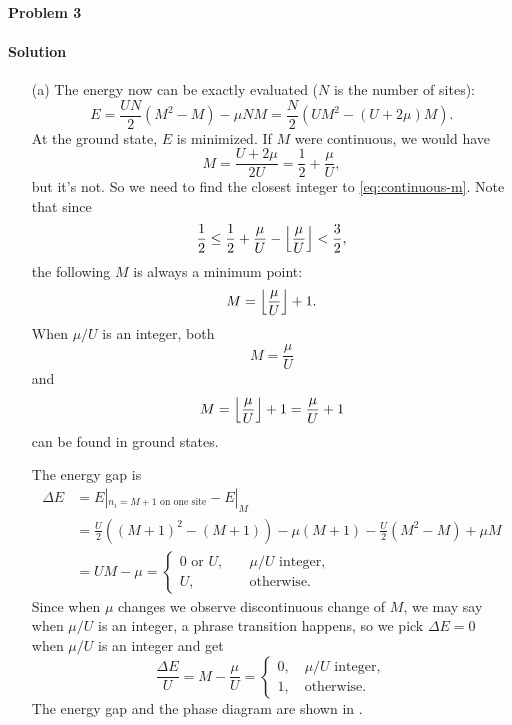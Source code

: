 \documentclass[hyperref, a4paper]{article}
\DeclarePairedDelimiter\floor{\lfloor}{\rfloor}
\begin{document}
\paragraph{Problem 3}

\paragraph{Solution} \begin{itemize}
\item[(a)] The energy now can be exactly evaluated ($N$ is the number of sites):
\begin{equation}
    E = \frac{U N}{2} (M^2 - M) - \mu NM
    = \frac{N}{2} (U M^2 - (U + 2\mu) M).
\end{equation}
At the ground state, $E$ is minimized.
If $M$ were continuous, we would have
\begin{equation}
    M = \frac{U + 2\mu}{2 U} = \frac{1}{2} + \frac{\mu}{U}, 
    \label{eq:continuous-m}
\end{equation}
but it's not. So we need to find the closest integer to \eqref{eq:continuous-m}.
Note that since
\[
    \frac{1}{2} \leq \frac{1}{2} + \frac{\mu}{U} - \floor*{\frac{\mu}{U}} < \frac{3}{2},
\]
the following $M$ is always a minimum point:
\begin{equation}
    M = \floor*{\frac{\mu}{U}} + 1.
\end{equation}
When $\mu / U$ is an integer, both 
\begin{equation}
    M = \frac{\mu}{U} 
\end{equation}
and 
\begin{equation}
    M = \floor*{\frac{\mu}{U}} + 1 = \frac{\mu}{U} + 1
\end{equation}
can be found in ground states.

The energy gap is 
\begin{equation}
    \begin{aligned}
        \Delta E &= E|_{n_i = M+1 \text{ on one site}} - E|_M  \\
        &= \frac{U}{2} ((M+1)^2 - (M+1)) - \mu (M+1)
        - \frac{U}{2} (M^2 - M) + \mu M \\
        &= UM - \mu
        = \begin{cases}
            0 \text{ or } U, \quad &\text{$\mu / U$ integer}, \\
            U,\quad &\text{otherwise}.
        \end{cases}
    \end{aligned}
\end{equation}
Since when $\mu$ changes we observe discontinuous change of $M$,
we may say when $\mu / U$ is an integer,
a phrase transition happens,
so we pick $\Delta E = 0$ when $\mu / U$ is an integer and get 
\begin{equation}
    \frac{\Delta E}{U} = M - \frac{\mu}{U}
    = \begin{cases}
        0, \quad \text{$\mu / U$ integer}, \\
        1, \quad \text{otherwise}. 
    \end{cases}
\end{equation}
The energy gap and the phase diagram are shown in .


\end{itemize}
\end{document}
